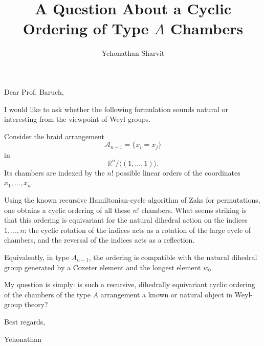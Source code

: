 \documentclass[11pt]{article}
\title{A Question About a Cyclic Ordering of Type \(A\) Chambers}
\author{Yehonathan Sharvit}
\date{}
\begin{document}
\maketitle

Dear Prof. Baruch,

I would like to ask whether the following formulation sounds natural or
interesting from the viewpoint of Weyl groups.

Consider the braid arrangement
\[
  \mathcal A_{n-1}=\{x_i=x_j\}
\]
in
\[
  \mathbb R^n/\langle(1,\ldots,1)\rangle.
\]
Its chambers are indexed by the \(n!\) possible linear orders of the
coordinates \(x_1,\ldots,x_n\).

Using the known recursive Hamiltonian-cycle algorithm of Zaks for permutations,
one obtains a cyclic ordering of all these \(n!\) chambers. What seems striking
is that this ordering is equivariant for the natural dihedral action on the
indices \(1,\ldots,n\): the cyclic rotation of the indices acts as a rotation of
the large cycle of chambers, and the reversal of the indices acts as a
reflection.

Equivalently, in type \(A_{n-1}\), the ordering is compatible with the natural
dihedral group generated by a Coxeter element and the longest element \(w_0\).

My question is simply: is such a recursive, dihedrally equivariant cyclic
ordering of the chambers of the type \(A\) arrangement a known or natural object
in Weyl-group theory?

Best regards,

Yehonathan
\end{document}
